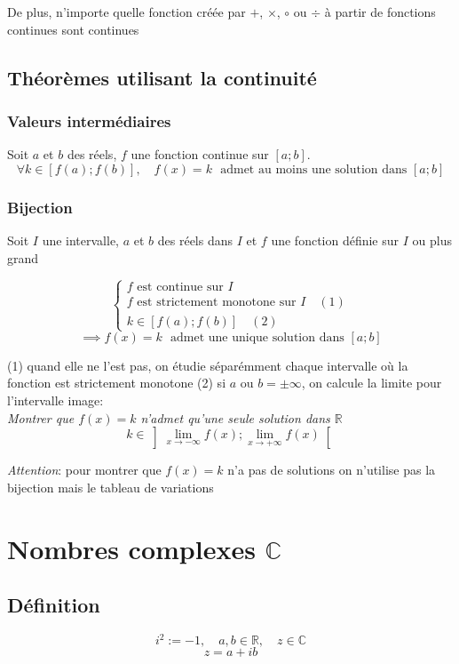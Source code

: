 \documentclass{article}
\newcommand{\R}{\mathds{R}}
\newcommand{\liminfty}{\lim_{x\to+\infty}}
\newcommand{\limminfty}{\lim_{x\to-\infty}}
\begin{document}
De plus, n'importe quelle fonction créée par $+$, $\times$, $\circ$ ou $\div$ à partir de fonctions continues sont continues

\subsection{Théorèmes utilisant la continuité}
\subsubsection{Valeurs intermédiaires}

Soit $a$ et $b$ des réels, $f$ une fonction continue sur $[a; b]$.
\[\forall k \in [f(a); f(b)],\quad f(x) = k\:\:\:\text{admet au moins une solution dans $[a;b]$}\]

\subsubsection{Bijection}

Soit $I$ une intervalle, $a$ et $b$ des réels dans $I$ et $f$ une fonction définie sur $I$ ou plus grand

$$
\begin{cases}
\text{$f$ est continue sur $I$}\\
\text{$f$ est strictement monotone sur $I$}\quad(1)\\
k \in [f(a); f(b)]\quad(2)
\end{cases}$$
$$
\implies f(x) = k\:\:\:\text{admet une unique solution dans $[a; b]$}
$$

\noindent(1) quand elle ne l'est pas, on étudie séparémment chaque intervalle où la fonction est strictement monotone
\vspace{2pt}
\noindent(2) si $a$ ou $b = \pm\infty$, on calcule la limite pour l'intervalle image:\\
\textit{Montrer que $f(x) = k$ n'admet qu'une seule solution dans $\R$}
\[k \in \left]\limminfty f(x); \liminfty f(x)\right[\]

\vspace{20pt}

\noindent\textit{Attention}: pour montrer que $f(x) = k$ n'a pas de solutions on n'utilise pas la bijection mais le tableau de variations

\newpage\section{Nombres complexes $\mathds{C}$}
\subsection{Définition}
\[i^2 := -1,\quad a, b \in \R,\quad z\in\mathds{C}\]
\[z = a + ib\]
\end{document}
